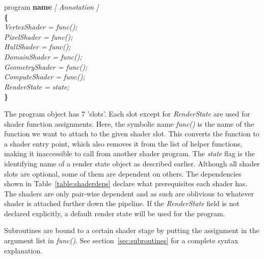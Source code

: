 \documentclass{article}
\newcommand{\SyntaxBox}[1]
{	
	\begin{center}
	\colorbox{orange!60}
	{
		\begin{minipage}{\linewidth}
		\hfill
		\begin{tabbing}
		#1
		\end{tabbing}
		\end{minipage}
	}
	\end{center}
}
\begin{document}
\SyntaxBox
{
	program \textbf{name} \textit{ [ Annotation ] } \\
	\textbf{\{} \= \\
	\>	\textit{VertexShader = func();} \\
	\>	\textit{PixelShader = func();} \\ 
	\>	\textit{HullShader = func();} \\ 
	\>	\textit{DomainShader = func();} \\ 
	\>	\textit{GeometryShader = func();} \\
	\>	\textit{ComputeShader = func();} \\
	\>	\textit{RenderState = state;} \\
	\textbf{\}}
}

The program object has 7 'slots'. Each slot except for \textit{RenderState} are used for shader function assignments. Here, the symbolic name \textit{func()} is the name of the function we want to attach to the given shader slot. This converts the function to a shader entry point, which also removes it from the list of helper functions, making it inaccessible to call from another shader program. The \textit{state} flag is the identifying name of a render state object as described earlier. Although all shader slots are optional, some of them are dependent on others. The dependencies shown in Table~\ref{table:shaderdeps} declare what prerequisites each shader has. The shaders are only pair-wise dependent and as such are oblivious to whatever shader is attached further down the pipeline. If the \textit{RenderState} field is not declared explicitly, a default render state will be used for the program.

Subroutines are bound to a certain shader stage by putting the assignment in the argument list in \textit{func()}. See section~\ref{sec:subroutines} for a complete syntax explanation.

\begin{table}[float]
\caption{Shader dependencies}
\label{table:shaderdeps}
\end{table}
\end{document}

